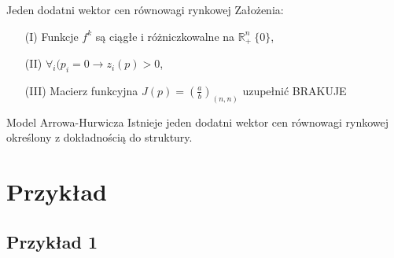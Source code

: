 \documentclass[a4paper, 11pt]{beamer}
\begin{document}
      \begin{frame}{Jeden dodatni wektor cen równowagi rynkowej}
	Założenia:
	\begin{enumerate}
	  \item[(I)] Funkcje $f^k$ są ciągłe i różniczkowalne na
	  $\mathbb{R}^n_{+} \ \{0\}$,

	  \item[(II)] $\forall_i (p_i = 0 \rightarrow z_i (p) > 0$,

	  \item[(III)] Macierz funkcyjna $J(p) = (\frac{a}{b})_{(n, n)}$
	  uzupełnić BRAKUJE
	\end{enumerate}

	\begin{block}{Model Arrowa-Hurwicza}
	  Istnieje jeden dodatni wektor cen równowagi rynkowej określony z
	  dokładnością do struktury.
	\end{block}

      \end{frame}

  \section{Przykład}
    \subsection{Przykład 1}
\end{document}
